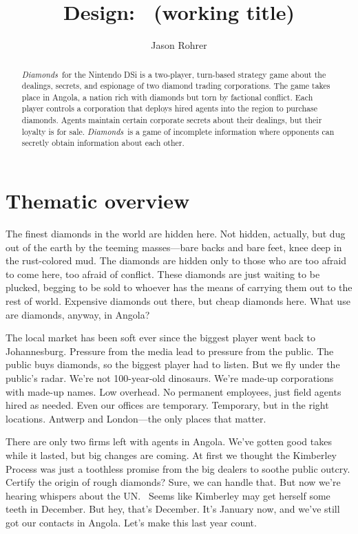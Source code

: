 \documentclass[12pt]{article}
\title{Design: \gtitle\ (working title)}
\author{Jason Rohrer}
\newcommand{\gtitle}{{\it Diamonds}}
\begin{document}
\maketitle


\begin{abstract}
\gtitle\ for the Nintendo DSi is a two-player, turn-based strategy game about the dealings, secrets, and espionage of two diamond trading corporations.  The game takes place in Angola, a nation rich with diamonds but torn by factional conflict.  Each player controls a corporation that deploys hired agents into the region to purchase diamonds.  Agents maintain certain corporate secrets about their dealings, but their loyalty is for sale.  \gtitle\ is a game of incomplete information where opponents can secretly obtain information about each other.  
\end{abstract}


\section{Thematic overview}

The finest diamonds in the world are hidden here.  Not hidden, actually, but dug out of the earth by the teeming masses---bare backs and bare feet, knee deep in the rust-colored mud.  The diamonds are hidden only to those who are too afraid to come here, too afraid of conflict.  These diamonds are just waiting to be plucked, begging to be sold to whoever has the means of carrying them out to the rest of world.  Expensive diamonds out there, but cheap diamonds here.  What use are diamonds, anyway, in Angola?

The local market has been soft ever since the biggest player went back to Johannesburg.   Pressure from the media lead to pressure from the public.  The public buys diamonds, so the biggest player had to listen.  But we fly under the public's radar.  We're not 100-year-old dinosaurs.  We're made-up corporations with made-up names.  Low overhead.  No permanent employees, just field agents hired as needed.  Even our offices are temporary.  Temporary, but in the right locations.  Antwerp and London---the only places that matter.

There are only two firms left with agents in Angola.  We've gotten good takes while it lasted, but big changes are coming.  At first we thought the Kimberley Process was just a toothless promise from the big dealers to soothe public outcry.  Certify the origin of rough diamonds?  Sure, we can handle that.  But now we're hearing whispers about the UN. \ Seems like Kimberley may get herself some teeth in December.  But hey, that's December.  It's January now, and we've still got our contacts in Angola.  Let's make this last year count.
\end{document}
